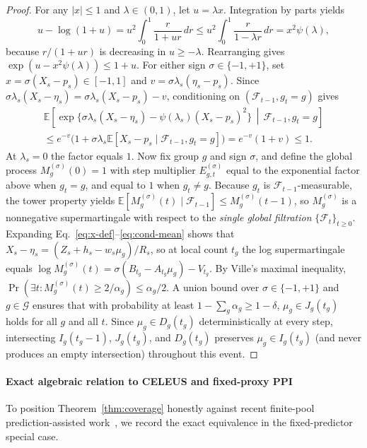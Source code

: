 \begin{proof}
For any $|x| \le 1$ and $\lambda \in (0, 1)$, let $u = \lambda x$. Integration by parts yields
\[
  u - \log(1 + u) = u^2 \int_0^1 \frac{r}{1 + u r}\,dr \le u^2 \int_0^1 \frac{r}{1 - \lambda r}\,dr = x^2 \psi(\lambda),
\]
because $r/(1+ur)$ is decreasing in $u \ge -\lambda$.
Rearranging gives $\exp(u - x^2 \psi(\lambda)) \le 1 + u$.
For either sign $\sigma \in \{-1, +1\}$, set $x = \sigma(X_s - p_s) \in [-1, 1]$ and $v = \sigma \lambda_s (\eta_s - p_s)$.
Since $\sigma \lambda_s(X_s - \eta_s) = \sigma \lambda_s(X_s - p_s) - v$, conditioning on $(\mathcal{F}_{t-1}, g_t = g)$ gives
\begin{align*}
  \mathbb{E}\!\left[\exp\!\bigl\{\sigma \lambda_s(X_s - \eta_s) - \psi(\lambda_s)(X_s - p_s)^2\bigr\} \,\middle|\, \mathcal{F}_{t-1}, g_t=g\right] \\
  \le e^{-v}\bigl(1 + \sigma \lambda_s \mathbb{E}[X_s - p_s \mid \mathcal{F}_{t-1}, g_t=g]\bigr) = e^{-v}(1 + v) \le 1.
\end{align*}
At $\lambda_s = 0$ the factor equals $1$.
Now fix group $g$ and sign $\sigma$, and define the global process $M_g^{(\sigma)}(0) = 1$ with step multiplier $E_{g,t}^{(\sigma)}$ equal to the exponential factor above when $g_t = g$, and equal to $1$ when $g_t \ne g$.
Because $g_t$ is $\mathcal{F}_{t-1}$-measurable, the tower property yields $\mathbb{E}[M_g^{(\sigma)}(t) \mid \mathcal{F}_{t-1}] \le M_g^{(\sigma)}(t-1)$, so $M_g^{(\sigma)}$ is a nonnegative supermartingale with respect to the \emph{single global filtration} $\{\mathcal{F}_t\}_{t \ge 0}$.
Expanding Eq.~\eqref{eq:x-def}--\eqref{eq:cond-mean} shows that $X_s - \eta_s = (Z_s + h_s - w_s \mu_g)/R_s$, so at local count $t_g$ the log supermartingale equals $\log M_g^{(\sigma)}(t) = \sigma(B_{t_g} - A_{t_g}\mu_g) - V_{t_g}$.
By Ville's maximal inequality, $\Pr(\exists t : M_g^{(\sigma)}(t) \ge 2/\alpha_g) \le \alpha_g/2$.
A union bound over $\sigma \in \{-1,+1\}$ and $g \in \mathcal{G}$ ensures that with probability at least $1 - \sum_g \alpha_g \ge 1 - \delta$, $\mu_g \in J_g(t_g)$ holds for all $g$ and all $t$.
Since $\mu_g \in D_g(t_g)$ deterministically at every step, intersecting $I_g(t_g-1)$, $J_g(t_g)$, and $D_g(t_g)$ preserves $\mu_g \in I_g(t_g)$ (and never produces an empty intersection) throughout this event.
\end{proof}

\paragraph{Exact algebraic relation to CELEUS and fixed-proxy PPI}
To position Theorem~\ref{thm:coverage} honestly against recent finite-pool prediction-assisted work~\cite{angelopoulos2023ppi,zhou2026celeus}, we record the exact equivalence in the fixed-predictor special case.

